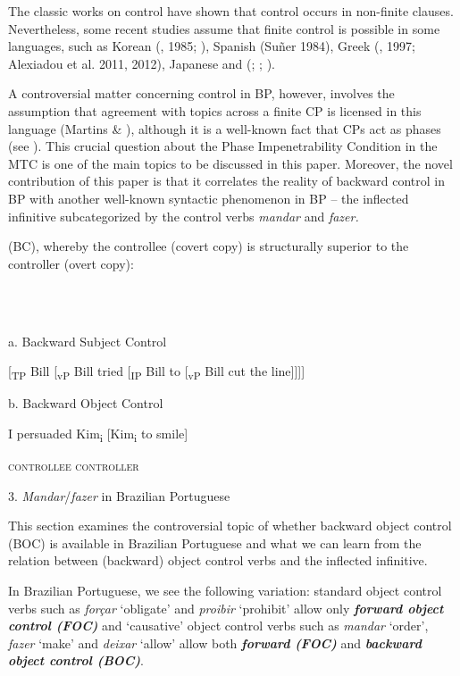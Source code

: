 \documentclass[output=paper]{langsci/langscibook}
\begin{document}
The classic works on control have shown that control occurs in non-finite clauses. Nevertheless, some recent studies assume that finite control is possible in some languages, such as Korean (\citealt{Yang1982}, 1985; \citealt{Borer1989}), Spanish (Suñer 1984), Greek (\citealt{Terzi1992}, 1997; Alexiadou et al. 2011, 2012), Japanese \citep{Uchibori2000} and (\citealt{Farrell1995}; \citealt{Rodrigues2004}; \citealt{Boeckx2006}).

A controversial matter concerning control in BP, however, involves the assumption that agreement with topics across a finite CP is licensed in this language (Martins \& \citealt{Nunes2010}), although it is a well-known fact that CPs act as phases (see \citealt{Chomsky2000}). This crucial question about the Phase Impenetrability Condition in the MTC is one of the main topics to be discussed in this paper. Moreover, the novel contribution of this paper is that it correlates the reality of backward control in BP with another well-known syntactic phenomenon in BP – the inflected infinitive subcategorized by the control verbs \textit{mandar} and \textit{fazer.}

(BC), whereby the controllee (covert copy) is structurally superior to the controller (overt copy):

\ea%
    \label{ex:moreno:3}
    \gll\\
        \\
    \glt
    \z

          a.  Backward Subject Control

[\textsubscript{TP} Bill [\textsubscript{vP} Bill tried [\textsubscript{IP} Bill to [\textsubscript{vP} Bill cut the line]]]]    

  b.  Backward Object Control 

I persuaded  Kim\textsubscript{i}    [Kim\textsubscript{i}    to smile]      

        \textsc{controllee  controller}

3. \textit{Mandar}/\textit{fazer} in Brazilian Portuguese

This section examines the controversial topic of whether backward object control (BOC) is available in Brazilian Portuguese and what we can learn from the relation between (backward) object control verbs and the inflected infinitive.

In Brazilian Portuguese, we see the following variation: standard object control verbs such as \textit{forçar} ‘obligate’ and \textit{proibir} ‘prohibit’ allow only \textbf{\textit{forw}}\textbf{\textit{ard object control (FOC)}}  and ‘causative’ object control verbs such as \textit{mandar} ‘order’, \textit{fazer} ‘make’ and \textit{deixar} ‘allow’ allow both \textbf{\textit{forward (FOC)}} and \textbf{\textit{backward object control (BOC)}}.  
\end{document}
